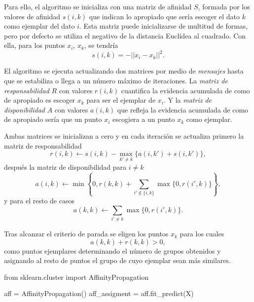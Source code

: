 Para ello, el algoritmo se inicializa con una matriz de afinidad $ S $, formada por los valores de afinidad $ s(i, k) $ que indican lo apropiado que sería escoger el dato $ k $ como ejemplar del dato $ i $. Esta matriz puede inicializarse de multitud de formas, pero por defecto se utiliza el negativo de la distancia Euclídea al cuadrado. Con ella, para los puntos $ x_i $, $ x_k $, se tendría
\begin{equation}
  s(i, k) = -||x_i - x_k||^2.
\end{equation}

El algoritmo se ejecuta actualizando dos matrices por medio de \textit{mensajes} hasta que se estabiliza o llega a un número máximo de iteraciones. La \textit{matriz de responsabilidad} $ R $ con valores $ r(i, k) $ cuantifica la evidencia acumulada de como de apropiado es escoger $ x_k $ para ser el ejemplar de $ x_i $. Y la \textit{matriz de disponibilidad} $ A $ con valores $ a(i, k) $ que refleja la evidencia acumulada de como de apropiado sería que un punto $ x_i $ escogiera a un punto $ x_k $ como ejemplar.

Ambas matrices se inicializan a cero y en cada iteración se actualiza primero la matriz de responsabilidad
\begin{equation}
  r(i, k) \leftarrow s(i, k) - \underset{k' \neq k}{\operatorname{max}}\{a(i, k') + s(i, k')\},
\end{equation}
después la matriz de disponibilidad para $ i \neq k $
\begin{equation}
  a(i, k) \leftarrow \operatorname{min}\left\{0, r(k, k) + \sum_{i' \notin \{i, k\}} \operatorname{max}\{0, r(i', k)\}\right\},
\end{equation}
y para el resto de casos
\begin{equation}
  a(k, k) \leftarrow \sum_{i' \neq k} \operatorname{max}\{0, r(i', k)\}.
\end{equation}

Tras alcanzar el criterio de parada se eligen los puntos $ x_k $ para los cuales
\begin{equation}
  a(k, k) + r(k, k) > 0,
\end{equation}
como puntos ejemplares determinando el número de grupos obtenidos y asignando al resto de puntos el grupo de cuyo ejemplar sean más similares.

\begin{mypython}[float={h}, caption={Propagación de afinidad.}, label={code:aff}]
  from sklearn.cluster import AffinityPropagation

  aff = AffinityPropagation()
  aff_assigment = aff.fit_predict(X)
\end{mypython}

